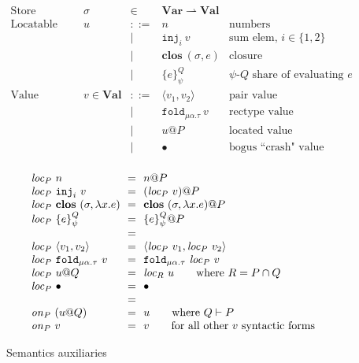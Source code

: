 \documentclass[10pt]{article}
\makeatletter
\newcommand{\kw}[1]{\ensuremath{\mathtt{#1}}}
\newcommand{\trec}[2]{\ensuremath{\mu {#1}.{#2}}}
\newcommand{\einj}[2]{\ensuremath{\kw{inj}_{#1}~{#2}}}
\newcommand{\epair}[2]{\ensuremath{\langle {#1}, {#2} \rangle}}
\newcommand{\elam}[2]{\ensuremath{\lambda {#1}.{#2}}}
\newcommand{\efold}[2]{\ensuremath{\kw{fold}_{#1}~{#2}}}
\newcommand{\vshare}[3]{\ensuremath{\{{#3}\}^{#1}_{#2}}}
\newcommand{\vloc}[2]{\ensuremath{{#1}\kw{@}{#2}}}
\newcommand{\vclos}[2]{\ensuremath{\mathbf{clos}~({#1},{#2})}}
\newcommand{\vcrash}{\ensuremath{\bullet}}
\newcommand{\env}{\ensuremath{\sigma}}
\newcommand{\locof}[2]{\ensuremath{\mathit{loc}_{#1}~{#2}}}
\newcommand{\getat}[2]{\ensuremath{\mathit{on}_{#1}~{#2}}}
\makeatother
\begin{document}
\begin{figure}
  \[\begin{array}{rlcll}
      \text{Store} & \sigma & \in & \mathbf{Var} \rightharpoonup \mathbf{Val}\\
      \text{Locatable value} & u & ::=  & n & \text{numbers} \\
                             && \mid & \einj{i}{v} & \text{sum elem, }i \in \{1,2\}\\
                             && \mid & \vclos{\env}{e}  & \text{closure} \\
                             && \mid & \vshare{Q}{\psi}{e} & \text{$\psi$-$Q$ share of evaluating $e$} \\
      \text{Value} & v  \in \mathbf{Val} & ::=  & \epair{v_1}{v_2} & \text{pair value}\\
                       && \mid & \efold{\trec{\alpha}{\tau}}{v} & \text{rectype value}\\
                   && \mid & \vloc{u}{P} & \text{located value}\\
                   && \mid & \vcrash & \text{bogus ``crash" value}\\
    \end{array}
  \]

\[\begin{array}{l@{~~=~~}l}
    \locof{P}{n} & \vloc{n}{P} \\
    \locof{P}{\einj{i}{v}} & \vloc{(\locof{P}{v})}{P} \\
    \locof{P}{\vclos{\env}{\elam{x}{e}}} & \vloc{\vclos{\env}{\elam{x}{e}}}{P}\\
    \locof{P}{\vshare{Q}{\psi}{e}} & \vloc{\vshare{Q}{\psi}{e}}{P}
    \\ \\
    \locof{P}{\epair{v_1}{v_2}} & \epair{\locof{P}{v_1}}{\locof{P}{v_2}}\\
    \locof{P}{ \efold{\trec{\alpha}{\tau}}{v}} &  \efold{\trec{\alpha}{\tau}}{\locof{P}{v}}\\
    \locof{P}{\vloc{u}{Q}} & \locof{R}{u} \qquad\text{where }R = P \cap Q\\
    \locof{P}{\vcrash} & \vcrash
    \\ \\
    \getat{P}{(\vloc{u}{Q})} & u \qquad \text{where }Q \vdash P\\
    \getat{P}{v} & v \qquad \text{for all other $v$ syntactic forms}\\
  \end{array}
\]
\caption{Semantics auxiliaries}
\label{fig:auxsem}
\end{figure}
\end{document}
